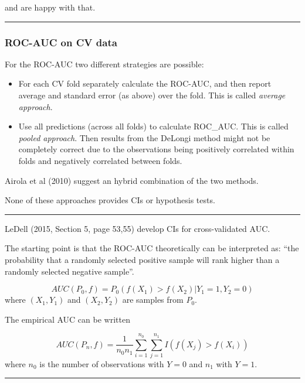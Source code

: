 \documentclass[
  letterpaper,
  DIV=11,
  numbers=noendperiod]{scrartcl}
\providecommand{\tightlist}{%
  \setlength{\itemsep}{0pt}\setlength{\parskip}{0pt}}\usepackage{longtable,booktabs,array}
\begin{document}
and are happy with that.

\begin{center}\rule{0.5\linewidth}{0.5pt}\end{center}

\hypertarget{roc-auc-on-cv-data}{%
\subsubsection{ROC-AUC on CV data}\label{roc-auc-on-cv-data}}

For the ROC-AUC two different strategies are possible:

\begin{itemize}
\tightlist
\item
  For each CV fold separately calculate the ROC-AUC, and then report
  average and standard error (as above) over the fold. This is called
  \emph{average approach}.
\item
  Use all predictions (across all folds) to calculate ROC\_AUC. This is
  called \emph{pooled approach}. Then results from the DeLongi method
  might not be completely correct due to the observations being
  positively correlated within folds and negatively correlated between
  folds.
\end{itemize}

Airola et al (2010) suggest an hybrid combination of the two methods.

None of these approaches provides CIs or hypothesis tests.

\begin{center}\rule{0.5\linewidth}{0.5pt}\end{center}

LeDell (2015, Section 5, page 53,55) develop CIs for cross-validated
AUC.

The starting point is that the ROC-AUC theoretically can be interpreted
as: ``the probability that a randomly selected positive sample will rank
higher than a randomly selected negative sample''.

\[AUC(P_0,f)=P_0(f(X_1)>f(X_2) | Y_1=1,Y_2=0)\] where \((X_1,Y_1)\) and
\((X_2,Y_2)\) are samples from \(P_0\).

The empirical AUC can be written

\[AUC(P_n,f)=\frac{1}{n_0n_1}\sum_{i=1}^{n_0}\sum_{j=1}^{n_1}I(f(X_j)>f(X_i))\]
where \(n_0\) is the number of observations with \(Y=0\) and \(n_1\)
with \(Y=1\).

\begin{center}\rule{0.5\linewidth}{0.5pt}\end{center}
\end{document}

